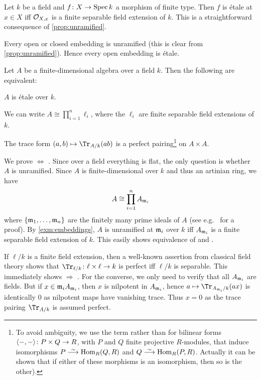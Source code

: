 \begin{exm}\label{exm:embeddings}
	\begin{alphanumerate}
		\item Let $k$ be a field and $f\colon X\morphism \Spec k$ a morphism of finite type. Then $f$ is étale at $x\in X$ iff $\mathcal{O}_{X,x}$ is a finite separable field extension of $k$. This is a straightforward consequence of \cref{prop:unramified}.
		\item Every open or closed embedding is unramified (this is clear from \cref{prop:unramified}). Hence every open embedding is étale.
	\end{alphanumerate}
\end{exm}
\begin{lem}\label{lem:etaleTrace}
	Let $A$ be a finite-dimensional algebra over a field $k$. Then the following are equivalent:
	\begin{alphanumerate}
		\item $A$ is étale over $k$.
		\item We can write $A\cong \prod_{i=1}^{n}\ell_i$, where the $\ell_i$ are finite separable field extensions of $k$.
		\item The trace form $(a,b)\mapsto \Tr_{A/k}(ab)$ is a perfect pairing\footnote{To avoid ambiguity, we use the term  rather than  for  bilinear forms $\langle -,-\rangle\colon P\times Q\morphism R$, with $P$ and $Q$ finite projective $R$-modules, that induce isomorphisms $P\isomorphism\Hom_R(Q,R)$ and $Q\isomorphism \Hom_R(P,R)$. Actually it can be shown that if either of these morphisms is an isomorphism, then so is the other).} on $A\times A$.
	\end{alphanumerate}
\end{lem}
\begin{proof*}
	We prove  $\Leftrightarrow$ . Since over a field everything is flat, the only question is whether $A$ is unramified. Since $A$ is finite-dimensional over $k$ and thus an artinian ring, we have 
	\begin{equation*}
		A\cong \prod_{i=1}^nA_{\mathfrak{m}_i}
	\end{equation*}
	where $\{\mathfrak{m}_1,\dotsc,\mathfrak{m}_n\}$ are the finitely many prime ideals of $A$ (see e.g.\ \cite[Corollary~2.16]{eisenbudCommAlg} for a proof). By \cref{exm:embeddings}, $A$ is unramified at $\mathfrak{m}_i$ over $k$ iff $A_{\mathfrak{m}_i}$ is a finite separable field extension of $k$. This easily shows equivalence of  and .
	
	If $\ell/k$ is a finite field extension, then a well-known assertion from classical field theory shows that $\Tr_{\ell/k}\colon \ell\times\ell\morphism k$ is perfect iff $\ell/k$ is separable. This immediately shows  $\Rightarrow$ . For the converse, we only need to verify that all $A_{\mathfrak{m}_i}$ are fields. But if $x\in\mathfrak{m}_iA_{\mathfrak{m}_i}$, then $x$ is nilpotent in $A_{\mathfrak{m}_i}$, hence $a\mapsto \Tr_{A_{\mm_i}/k}(ax)$ is identically $0$ as nilpotent maps have vanishing trace. Thus $x=0$ as the trace pairing $\Tr_{A/k}$ is assumed perfect.
\end{proof*}
